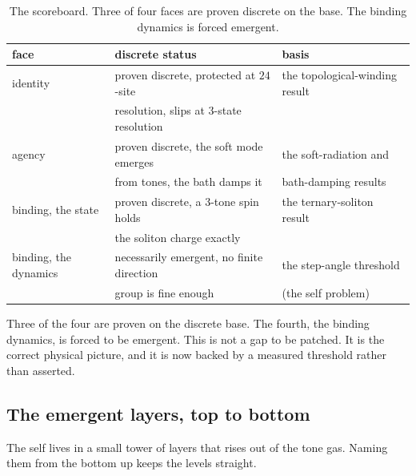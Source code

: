 \begin{table}[ht]
\centering
\begin{tabular}{@{}lll@{}}
\toprule
face & discrete status & basis \\
\midrule
identity & proven discrete, protected at $24$-site & the topological-winding result \\
 & resolution, slips at $3$-state resolution & \\
agency & proven discrete, the soft mode emerges & the soft-radiation and \\
 & from tones, the bath damps it & bath-damping results \\
binding, the state & proven discrete, a $3$-tone spin holds & the ternary-soliton result \\
 & the soliton charge exactly & \\
binding, the dynamics & necessarily emergent, no finite direction & the step-angle threshold \\
 & group is fine enough & (the self problem) \\
\bottomrule
\end{tabular}
\caption{The scoreboard. Three of four faces are proven discrete on the base. The binding dynamics is forced emergent.}
\label{tab:scoreboard}
\end{table}

Three of the four are proven on the discrete base. The fourth, the binding dynamics, is forced to be emergent. This is not a gap to be patched. It is the correct physical picture, and it is now backed by a measured threshold rather than asserted.

\subsection{The emergent layers, top to bottom}

The self lives in a small tower of layers that rises out of the tone gas. Naming them from the bottom up keeps the levels straight.

